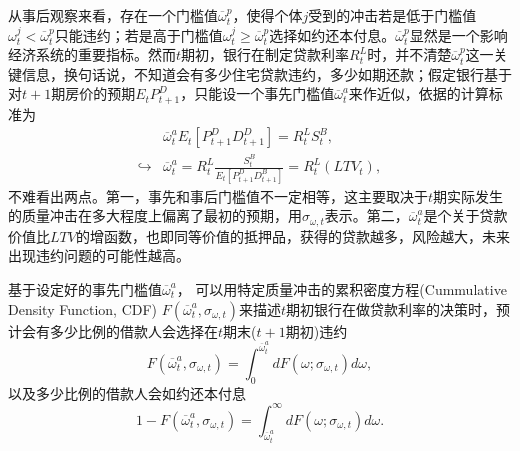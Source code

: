 从事后观察来看，存在一个门槛值$\overline{\omega}_{t}^{p}$，使得个体$j$受到的冲击若是低于门槛值$\omega_{t}^{j} < \overline{\omega}_{t}^{p}$只能违约；若是高于门槛值$\omega_{t}^{j}  \ge \overline{\omega}_{t}^{p}$选择如约还本付息。$\overline{\omega}_{t}^{p}$显然是一个影响经济系统的重要指标。然而$t$期初，银行在制定贷款利率$R_{t}^{L}$时，并不清楚$\overline{\omega}_{t}^{p}$这一关键信息，换句话说，不知道会有多少住宅贷款违约，多少如期还款；假定银行基于对$t+1$期房价的预期$E_{t} P_{t+1}^{D}$，只能设一个事先门槛值$\overline{\omega}_{t}^{a}$来作近似，依据的计算标准为
\begin{equation}
  \label{eq:housing-expected-exante-omega}
  \begin{split}
      & \overline{\omega}_{t}^{a} E_{t} \left[ P_{t+1}^{D} D_{t+1}^{D} \right]= R_{t}^{L} S_{t}^{B}, \\
      \hookrightarrow &
      \overline{\omega}_{t}^{a} = R_{t}^{L} \frac{S_{t}^{B}}{E_{t} \left[ P_{t+1}^{D} D_{t+1}^{B} \right]}
      = R_{t}^{L} \left( LTV_{t} \right),
  \end{split}
\end{equation}
不难看出两点。第一，事先和事后门槛值不一定相等，这主要取决于$t$期实际发生的质量冲击在多大程度上偏离了最初的预期，用$\sigma_{\omega, t}$表示。第二，$\overline{\omega}_{t}^{a}$是个关于贷款价值比$LTV$的增函数，也即同等价值的抵押品，获得的贷款越多，风险越大，未来出现违约问题的可能性越高。

基于设定好的事先门槛值$\overline{\omega}_{t}^{a}$，%
可以用特定质量冲击的累积密度方程(Cummulative Density Function, CDF) $F \left(\overline{\omega}_{t}^{a}, \sigma_{\omega, t} \right)$来描述$t$期初银行在做贷款利率的决策时，预计会有多少比例的借款人会选择在$t$期末($t+1$期初)违约
\begin{equation}
  \label{eq:housing-F-function-CDF}
  F \left(\overline{\omega}_{t}^{a}, \sigma_{\omega, t} \right)
  = \int_{0}^{\overline{\omega}_{t}^{a}} d F \left( \omega; \sigma_{\omega, t} \right) d \omega,
\end{equation}
以及多少比例的借款人会如约还本付息
\begin{equation}
  \label{eq:housing-FF-function-CDF}
  1 - F \left(\overline{\omega}_{t}^{a}, \sigma_{\omega, t} \right)
  = \int_{\overline{\omega}_{t}^{a}}^{\infty} d F \left( \omega; \sigma_{\omega, t} \right) d \omega.
\end{equation}

